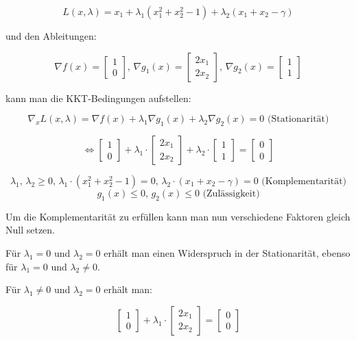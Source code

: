 \documentclass[a4paper, 12pt]{report}
\begin{document}
$$L(x, \lambda) = x_1 + \lambda_1(x_1^2 + x_2^2 - 1) + \lambda_2(x_1 + x_2 - \gamma)$$

und den Ableitungen:

$$\nabla f(x) = \begin{bmatrix}1 \\ 0\end{bmatrix} \text{, } \nabla g_1(x) = \begin{bmatrix}2x_1\\2x_2\end{bmatrix} \text{, } \nabla g_2(x) = \begin{bmatrix}1\\1\end{bmatrix}$$

kann man die KKT-Bedingungen aufstellen:

$$\nabla_x L(x, \lambda) = \nabla f(x) + \lambda_1\nabla g_1(x) + \lambda_2\nabla g_2(x) = 0 \text{ (Stationarität)}$$

$$ \Leftrightarrow \begin{bmatrix}1\\0\end{bmatrix} + \lambda_1\cdot \begin{bmatrix}2x_1\\2x_2\end{bmatrix} + \lambda_2\cdot \begin{bmatrix}1\\1\end{bmatrix} = \begin{bmatrix}0\\0\end{bmatrix}$$

$$\lambda_1\text{, } \lambda_2 \geq 0\text{, } \lambda_1\cdot (x_1^2 + x_2^2 - 1) = 0 \text{, } \lambda_2\cdot (x_1 + x_2 - \gamma) = 0 \text{ (Komplementarität)}$$
$$g_1(x) \leq 0 \text{, } g_2(x) \leq 0 \text{ (Zulässigkeit)}$$

Um die Komplementarität zu erfüllen kann man nun verschiedene Faktoren gleich Null setzen.\par

Für $\lambda_1 = 0$ und $\lambda_2 = 0$ erhält man einen Widerspruch in der Stationarität, ebenso für
$\lambda_1 = 0$ und $\lambda_2 \neq 0$.\par
Für $\lambda_1 \neq 0$ und $\lambda_2 = 0$ erhält man:

$$\begin{bmatrix}1\\0\end{bmatrix} + \lambda_1 \cdot \begin{bmatrix}2x_1\\2x_2\end{bmatrix} = \begin{bmatrix}0\\0\end{bmatrix}$$
\end{document}
